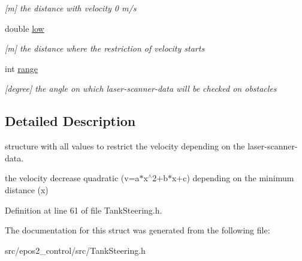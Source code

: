 \begin{DoxyCompactItemize}
\begin{DoxyCompactList}\small\item\em \mbox{[}m\mbox{]} the distance with velocity 0 m/s \end{DoxyCompactList}\item 
\hypertarget{structTankSteering_1_1distanceStruct_a457ba78027c23e665b5d16909872cc81}{double \hyperlink{structTankSteering_1_1distanceStruct_a457ba78027c23e665b5d16909872cc81}{low}}\label{structTankSteering_1_1distanceStruct_a457ba78027c23e665b5d16909872cc81}

\begin{DoxyCompactList}\small\item\em \mbox{[}m\mbox{]} the distance where the restriction of velocity starts \end{DoxyCompactList}\item 
\hypertarget{structTankSteering_1_1distanceStruct_a3c3fec327c3233ffc23ad60179f8cec9}{int \hyperlink{structTankSteering_1_1distanceStruct_a3c3fec327c3233ffc23ad60179f8cec9}{range}}\label{structTankSteering_1_1distanceStruct_a3c3fec327c3233ffc23ad60179f8cec9}

\begin{DoxyCompactList}\small\item\em \mbox{[}degree\mbox{]} the angle on which laser-\/scanner-\/data will be checked on obstacles \end{DoxyCompactList}\end{DoxyCompactItemize}


\subsection{Detailed Description}
structure with all values to restrict the velocity depending on the laser-\/scanner-\/data. 

the velocity decrease quadratic (v=a$\ast$x$^\wedge$2+b$\ast$x+c) depending on the minimum distance (x) 

Definition at line 61 of file Tank\-Steering.\-h.



The documentation for this struct was generated from the following file\-:\begin{DoxyCompactItemize}
\item 
src/epos2\-\_\-control/src/Tank\-Steering.\-h\end{DoxyCompactItemize}
